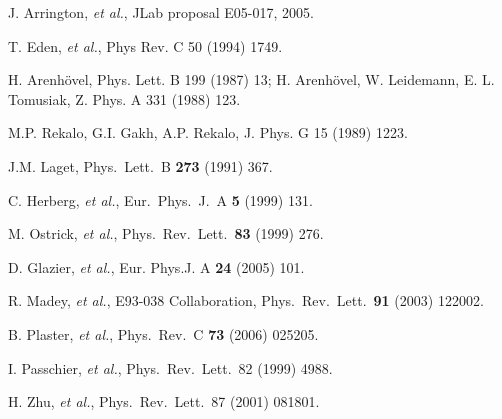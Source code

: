 \begin{thebibliography}{PPV06}
J. Arrington, {\it et al.}, JLab proposal E05-017, 2005.

T. Eden, {\it et al.}, Phys Rev. C 50 (1994) 1749.

H. Arenh\"ovel, Phys. Lett. B 199 (1987) 13; H. Arenh\"ovel, 
W. Leidemann, E. L. Tomusiak, Z. Phys. A 331 (1988) 123. 

M.P. Rekalo, G.I. Gakh, A.P. Rekalo, J. Phys. G 15 (1989) 1223. 

  J.M. Laget,
  Phys.\ Lett.\ B {\bf 273} (1991) 367.

C. Herberg, {\it et al.},
Eur.\ Phys.\ J.\ A {\bf 5} (1999) 131.

M. Ostrick, {\it et al.},
Phys.\ Rev.\ Lett.\  {\bf 83} (1999) 276.

D. Glazier, {\it et al.}, Eur. Phys.J. A {\bf 24} (2005) 101.

R. Madey, {\it et al.}, E93-038 Collaboration,
Phys.\ Rev.\ Lett.\  {\bf 91} (2003) 122002.

B. Plaster, {\it et al.},  
  Phys.\ Rev.\ C {\bf 73} (2006) 025205.

I. Passchier, {\it et al.},
Phys.\ Rev.\ Lett.\  82 (1999) 4988.

H. Zhu, {\it et al.},
Phys.\ Rev.\ Lett.\   87 (2001) 081801.


\end{thebibliography}
